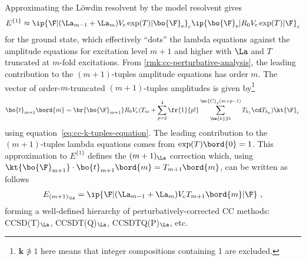 \begin{ex}
Approximating the L\"owdin resolvent by the model resolvent gives
\begin{align}
  E^{\{1\}}
\approx
  \ip{\F|(\La_{m-1} + \La_m)V_{\text{c}}\,\text{exp}(T)|\bo{\F}_{\text{e}}}_{\text{c}}
  \ip{\bo{\F}_{\text{e}}|R_0 V_{\text{c}}\,\text{exp}(T)|\F}_{\text{c}}
\end{align}
for the ground state, which effectively ``dots'' the lambda equations against the amplitude equations for excitation level $m+1$ and higher with $\La$ and $T$ truncated at $m$-fold excitations.
From \cref{rmk:cc-perturbative-analysis}, the leading contribution to the $(m+1)$-tuples amplitude equations  has order $m$.
The vector of order-$m$-truncated $(m+1)$-tuples amplitudes is given by\footnote{$\bm{k}\not\ni 1$ here means that integer compositions containing 1 are excluded.}
\begin{align}
  \bo{t}_{m+1}\bord{m}
=
  \br{\bo{\F}_{m+1}}R_0
    V_{\text{c}}
    (
      T_m
    +
      \sum_{p=2}^4
      \fr{1}{p!}
      \sum_{\bm{k}\not\ni 1}^{\mc{C}_p(m+p-1)}
      T_{k_1}
      \cd
      T_{k_p}
    )
  \kt{\F}_{\text{c}}\,
\end{align}
using equation~\ref{eq:cc-k-tuples-equation}.
The leading contribution to the $(m+1)$-tuples lambda equations comes from $\text{exp}(T)\bord{0}= 1$.
This approximation to $E^{\{1\}}$ defines the
$
  (m+1)_\La
$
correction
which,
using
$
  \kt{\bo{\F}_{\text{m+1}}}\cdot
  \bo{t}_{m+1}\bord{m}
=
  T_{m+1}\bord{m}
$, can be written as follows
\begin{align}
  E_{(m+1)_\La}
=
  \ip{\F|(\La_{m-1} + \La_m) V_{\text{c}} T_{m+1}\bord{m}|\F}\,\,,
\end{align}
forming a well-defined hierarchy of perturbatively-corrected CC methods:
CCSD(T)$_\La$,
CCSDT(Q)$_\La$,
CCSDTQ(P)$_\La$,
etc.
\end{ex}


